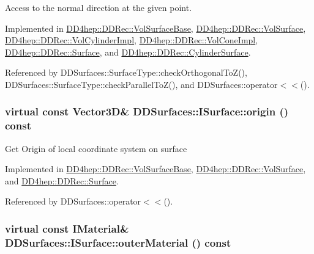 Access to the normal direction at the given point. 

Implemented in \hyperlink{class_d_d4hep_1_1_d_d_rec_1_1_vol_surface_base_a0689bccd5a024798609f3ce1b39c7d61}{DD4hep::DDRec::VolSurfaceBase}, \hyperlink{class_d_d4hep_1_1_d_d_rec_1_1_vol_surface_a2c5a55647d8f69637f4fc8d88bc70b67}{DD4hep::DDRec::VolSurface}, \hyperlink{class_d_d4hep_1_1_d_d_rec_1_1_vol_cylinder_impl_a1863142729883b2e20c78dadabd04927}{DD4hep::DDRec::VolCylinderImpl}, \hyperlink{class_d_d4hep_1_1_d_d_rec_1_1_vol_cone_impl_aea04fc521c39ffc8e97ae3f700533e7a}{DD4hep::DDRec::VolConeImpl}, \hyperlink{class_d_d4hep_1_1_d_d_rec_1_1_surface_a1a4f7412be6079af165bb7a3b3e7770c}{DD4hep::DDRec::Surface}, and \hyperlink{class_d_d4hep_1_1_d_d_rec_1_1_cylinder_surface_a42de2f110f904bf4d4862bd0b149d49a}{DD4hep::DDRec::CylinderSurface}.

Referenced by DDSurfaces::SurfaceType::checkOrthogonalToZ(), DDSurfaces::SurfaceType::checkParallelToZ(), and DDSurfaces::operator$<$$<$().\hypertarget{class_d_d_surfaces_1_1_i_surface_a552cf76ca76154d0a6d9709d826b57f4}{
\subsubsection[{origin}]{\setlength{\rightskip}{0pt plus 5cm}virtual const {\bf Vector3D}\& DDSurfaces::ISurface::origin () const}}
\label{class_d_d_surfaces_1_1_i_surface_a552cf76ca76154d0a6d9709d826b57f4}
Get Origin of local coordinate system on surface 

Implemented in \hyperlink{class_d_d4hep_1_1_d_d_rec_1_1_vol_surface_base_a8c0138c1595c6acbc94d5d7af57d468a}{DD4hep::DDRec::VolSurfaceBase}, \hyperlink{class_d_d4hep_1_1_d_d_rec_1_1_vol_surface_a4be2b8d1ebddf2ac394a55efc28a2e6e}{DD4hep::DDRec::VolSurface}, and \hyperlink{class_d_d4hep_1_1_d_d_rec_1_1_surface_ad3b8710337ded85b4b277eca2d38cc8a}{DD4hep::DDRec::Surface}.

Referenced by DDSurfaces::operator$<$$<$().\hypertarget{class_d_d_surfaces_1_1_i_surface_a49dfd8a5eef419226abc675b8d1126a5}{
\subsubsection[{outerMaterial}]{\setlength{\rightskip}{0pt plus 5cm}virtual const {\bf IMaterial}\& DDSurfaces::ISurface::outerMaterial () const}}
\label{class_d_d_surfaces_1_1_i_surface_a49dfd8a5eef419226abc675b8d1126a5}


